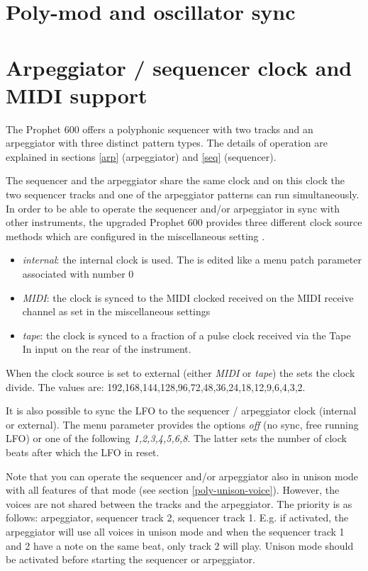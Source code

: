 \documentclass[landscape, 11pt, oneside]{report}
\newenvironment{flowtext}{\addmargin[0cm]{7cm}}{\endaddmargin} %
\begin{document}
\begin{flowtext}


\section{Poly-mod and oscillator sync}\label{polymod}



\section{Arpeggiator / sequencer clock and MIDI support}\label{sync}

The Prophet 600 offers a polyphonic sequencer with two tracks and an arpeggiator with three distinct pattern types. The details of operation are explained in sections \ref{arp} (arpeggiator) and \ref{seq} (sequencer).

The sequencer and the arpeggiator share the same clock and on this clock the two sequencer tracks and one of the arpeggiator patterns can run simultaneously. In order to be able to operate the sequencer and/or arpeggiator in sync with other instruments, the upgraded Prophet 600 provides three different clock source methods which are configured in the miscellaneous setting \clocksync.
\begin{itemize}
  \item \textit{internal}: the internal clock is used. The \clock is edited like a menu patch parameter associated with number 0
  \item \textit{MIDI}: the clock is synced to the MIDI clocked received on the MIDI receive channel as set in the  miscellaneous settings
  \item \textit{tape}: the clock is synced to a fraction of a pulse clock received via the Tape In input on the rear of the instrument. 
\end{itemize}  

When the clock source is set to external (either \textit{MIDI} or \textit{tape}) the \clock sets the clock divide. The values are: 192,168,144,128,96,72,48,36,24,18,12,9,6,4,3,2.

It is also possible to sync the LFO to the sequencer / arpeggiator clock (internal or external). The menu parameter \lfosync provides the options \textit{off} (no sync, free running LFO) or one of the following \textit{1,2,3,4,5,6,8}. The latter sets the number of clock beats after which the LFO in reset.

Note that you can operate the sequencer and/or arpeggiator also in unison mode with all features of that mode (see section \ref{poly-unison-voice}). However, the voices are not shared between the tracks and the arpeggiator. The priority is as follows: arpeggiator, sequencer track 2, sequencer track 1. E.g. if activated, the arpeggiator will use all voices in unison mode and when the sequencer track 1 and 2 have a note on the same beat, only track 2 will play. Unison mode should be activated before starting the sequencer or arpeggiator.


\end{flowtext}
\end{document}
